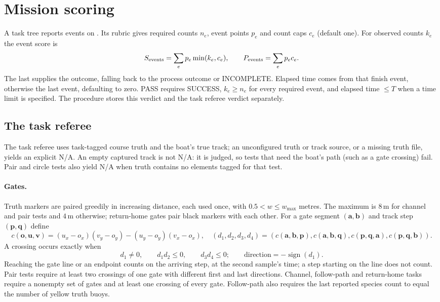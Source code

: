 \section{Mission scoring}
\label{sec:mission}

A task tree reports events on . Its rubric gives required
counts $n_e$, event points $p_e$ and count caps $c_e$ (default one). For
observed counts $k_e$ the event score is
\[
 S_{\rm events}=\sum_e p_e\min(k_e,c_e),\qquad
 P_{\rm events}=\sum_e p_ec_e.
\]
The last  supplies the outcome, falling back to the process
outcome or INCOMPLETE. Elapsed time comes from that finish event, otherwise the
last event, defaulting to zero. PASS requires SUCCESS, $k_e\ge n_e$ for every
required event, and elapsed time $\le T$ when a time limit is specified.
The procedure stores this verdict and the task referee verdict separately.

\subsection{The task referee}

The task referee uses task-tagged course truth and the boat's true track;
an unconfigured truth or track source, or a missing truth file, yields an
explicit N/A. An empty captured track is not N/A: it is judged, so tests that need
the boat's path (such as a gate crossing) fail. Pair and circle tests also yield
N/A when truth contains no elements tagged for that test.

\paragraph{Gates.} Truth markers are paired greedily in increasing distance,
each used once, with $0.5<w\le w_{\max}$ metres. The maximum is $8$\,m for
channel and pair tests and $4$\,m otherwise; return-home gates pair black
markers with each other. For a gate segment $(\bm a,\bm b)$ and track step
$(\bm p,\bm q)$ define
\[
 c(\bm o,\bm u,\bm v)=(u_x-o_x)(v_y-o_y)-(u_y-o_y)(v_x-o_x),
 \quad(d_1,d_2,d_3,d_4)=
 (c(\bm a,\bm b,\bm p),c(\bm a,\bm b,\bm q),
 c(\bm p,\bm q,\bm a),c(\bm p,\bm q,\bm b)).
\]
A crossing occurs exactly when
\[
 d_1\ne0,\qquad d_1d_2\le0,\qquad d_3d_4\le0;
 \qquad \text{direction}=-\operatorname{sign}(d_1).
\]
Reaching the gate line or an endpoint counts on the arriving step, at the
second sample's time; a step starting on the line does not count. Pair tests
require at least two crossings of one gate with different first and last
directions. Channel, follow-path and return-home tasks require a nonempty
set of gates and at least one crossing of every gate. Follow-path also requires
the last reported species count to equal the number of yellow truth buoys.

